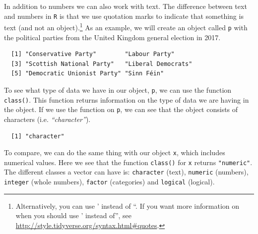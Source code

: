 \documentclass[12pt,oneside]{reedthesis}
\theoremstyle{definition}
\theoremstyle{definition}
\theoremstyle{definition}
\theoremstyle{remark}
\begin{document}
  In addition to numbers we can also work with text. The difference
  between text and numbers in \texttt{R} is that we use quotation marks to
  indicate that something is text (and not an object).\footnote{Alternatively,
    you can use ' instead of ``. If you want more information on when you
    should use ' instead of'', see
    \url{http://style.tidyverse.org/syntax.html\#quotes}.} As an example,
  we will create an object called \texttt{p} with the political parties
  from the United Kingdom general election in 2017.
  \begin{Shaded}
  \begin{Highlighting}[]
  \StringTok{ }\NormalTok{(}\NormalTok{, }\NormalTok{, }\NormalTok{, }
         \NormalTok{, }\NormalTok{, }\NormalTok{) }
  
  \end{Highlighting}
  \end{Shaded}
  \begin{verbatim}
  [1] "Conservative Party"        "Labour Party"             
  [3] "Scottish National Party"   "Liberal Democrats"        
  [5] "Democratic Unionist Party" "Sinn Féin"                
  \end{verbatim}
  To see what type of data we have in our object, \texttt{p}, we can use
  the function \texttt{class()}. This function returns information on the
  type of data we are having in the object. If we use the function on
  \texttt{p}, we can see that the object consists of characters (i.e.
  \emph{``character''}).
  \begin{Shaded}
  \begin{Highlighting}[]
  \end{Highlighting}
  \end{Shaded}
  \begin{verbatim}
  [1] "character"
  \end{verbatim}
  To compare, we can do the same thing with our object \texttt{x}, which
  includes numerical values. Here we see that the function
  \texttt{class()} for \texttt{x} returns \texttt{"numeric"}. The
  different classes a vector can have is: \texttt{character} (text),
  \texttt{numeric} (numbers), \texttt{integer} (whole numbers),
  \texttt{factor} (categories) and \texttt{logical} (logical).
  \begin{Shaded}
  \begin{Highlighting}[]
  \end{Highlighting}
  \end{Shaded}
\end{document}
